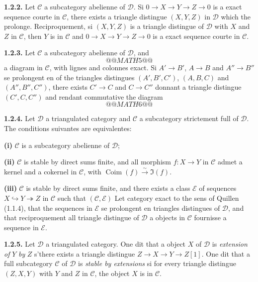 \documentclass[12pt,a4paper]{article}
\theoremstyle{plain}
\theoremstyle{definition}
\theoremstyle{remark}
\DeclareMathOperator{\Coim}{Coim}
\newcommand{\cC}{\mathcal{C}}
\newcommand{\cD}{\mathcal{D}}
\newcommand{\cE}{\mathcal{E}}
\begin{document}
\smallskip

\noindent
\textbf{1.2.2.} Let $\cC$ a subcategory abelienne of $\cD$. Si $0 \to X \to Y \to Z \to 0$ is a exact sequence courte in $\cC$, there exists a triangle distingue $(X, Y, Z)$ in $\cD$ which the prolonge. Reciproquement, si $(X, Y, Z)$ is a triangle distingue of $\cD$ with $X$ and $Z$ in $\cC$, then $Y$ is in $\cC$ and $0 \to X \to Y \to Z \to 0$ is a exact sequence courte in $\cC$.

\smallskip

\noindent
\textbf{1.2.3.} Let $\cC$ a subcategory abelienne of $\cD$, and
\[
@@MATH5@@
\]
a diagram in $\cC$, with lignes and colonnes exact. Si $A' \to B'$, $A \to B$ and $A'' \to B''$ se prolongent en of the triangles distingues $(A', B', C')$, $(A, B, C)$ and $(A'', B'', C'')$, there exists $C' \to C$ and $C \to C''$ donnant a triangle distingue $(C', C, C'')$ and rendant commutative the diagram
\[
@@MATH6@@
\]

\smallskip

\noindent
\textbf{1.2.4.} Let $\cD$ a triangulated category and $\cC$ a subcategory strictement full of $\cD$. The conditions suivantes are equivalentes:

\smallskip

\noindent
\textbf{(i)} $\cC$ is a subcategory abelienne of $\cD$;

\noindent
\textbf{(ii)} $\cC$ is stable by direct sums finite, and all morphism $f : X \to Y$ in $\cC$ admet a kernel and a cokernel in $\cC$, with $\Coim(f) \xrightarrow{\sim} \Im(f)$.

\smallskip

\noindent
\textbf{(iii)} $\cC$ is stable by direct sums finite, and there exists a class $\cE$ of sequences $X \hookrightarrow Y \twoheadrightarrow Z$ in $\cC$ such that $(\cC, \cE)$ Let category exact to the sens of Quillen (1.1.4), that the sequences in $\cE$ se prolongent en triangles distingues of $\cD$, and that reciproquement all triangle distingue of $\cD$ a objects in $\cC$ fournisse a sequence in $\cE$.

\smallskip

\noindent
\textbf{1.2.5.} Let $\cD$ a triangulated category. One dit that a object $X$ of $\cD$ is \emph{extension of} $Y$ \emph{by} $Z$ s'there exists a triangle distingue $Z \to X \to Y \to Z[1]$. One dit that a full subcategory $\cC$ of $\cD$ is \emph{stable by extensions} si for every triangle distingue $(Z, X, Y)$ with $Y$ and $Z$ in $\cC$, the object $X$ is in $\cC$.
\end{document}

